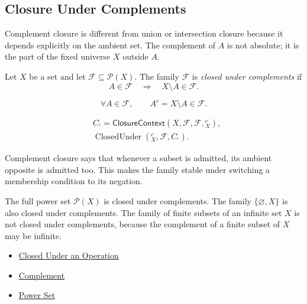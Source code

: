 \subsection{Closure Under Complements}

\begin{remark*}[Exposition]
Complement closure is different from union or intersection closure because it
depends explicitly on the ambient set.  The complement of \(A\) is not
absolute; it is the part of the fixed universe \(X\) outside \(A\).
\end{remark*}

\begin{definition}\label{def:closed-under-complements}
Let \(X\) be a set and let \(\mathcal{F}\subseteq\mathcal{P}(X)\).  The family
\(\mathcal{F}\) is \emph{closed under complements} if
\[
  A\in\mathcal{F}
  \quad\Longrightarrow\quad
  X\setminus A\in\mathcal{F}.
\]
\end{definition}

\begin{remark*}
\[
  \forall A\in\mathcal{F},\qquad A^c=X\setminus A\in\mathcal{F}.
\]
\end{remark*}

\begin{remark*}
\[
\begin{aligned}
&C_{{}^c}=\mathsf{ClosureContext}(X,\mathcal{F},\mathcal{F},{}^c_X),\\
&\operatorname{ClosedUnder}({}^c_X,\mathcal{F},C_{{}^c}).
\end{aligned}
\]
\end{remark*}

\begin{remark*}[Interpretation]
Complement closure says that whenever a subset is admitted, its ambient
opposite is admitted too.  This makes the family stable under switching a
membership condition to its negation.
\end{remark*}

\begin{remark*}[Examples]
The full power set \(\mathcal{P}(X)\) is closed under complements.  The family
\(\{\varnothing,X\}\) is also closed under complements.  The family of finite
subsets of an infinite set \(X\) is not closed under complements, because the
complement of a finite subset of \(X\) may be infinite.
\end{remark*}

\begin{dependencies}
\begin{itemize}
  \item \hyperref[def:closed-under-operation]{Closed Under an Operation}
  \item \hyperref[def:complement]{Complement}
  \item \hyperref[def:power-set]{Power Set}
\end{itemize}
\end{dependencies}
